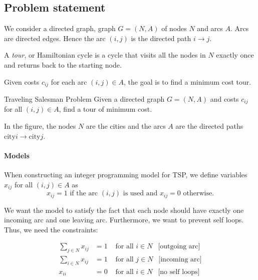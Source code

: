 \subsection*{Problem statement}
We consider a directed graph, graph $G = (N,A)$ of nodes $N$ and arcs $A$.   Arcs are directed edges.  Hence the arc $(i,j)$ is the directed path $i \to j$.

A \emph{tour}, or Hamiltonian cycle %
is a cycle that visits all the nodes in $N$ exactly once and returns back to the starting node. 


Given costs $c_{ij}$ for each arc $(i,j) \in A$, the goal is to find a minimum cost tour.


\begin{general}{Traveling Salesman Problem}{\nphard}
Given a directed graph $G = (N,A)$ and costs $c_{ij}$ for all $(i,j) \in A$, find a tour of minimum cost.
\end{general}
\begin{center}
\end{center}
In the figure, the nodes $N$ are the cities and the arcs $A$ are the directed paths $\text{city} i \to \text{city} j$.

\paragraph{Models}
When constructing an integer programming model for TSP, we define variables $x_{ij}$ for all $(i,j) \in A$ as 
$$
x_{ij } = 1 \text{ if the arc $(i,j)$ is used  and   }  x_{ij} = 0 \text{   otherwise.}
$$

We want the model to satisfy the fact that each node should have exactly one incoming arc and one leaving arc.  Furthermore, we want to prevent self loops.  Thus, we need the constraints:

\begin{align}
\label{eq:tsp-part-model}
\sum_{j\in N} x_{ij} &= 1 & \text{ for all } i \in N \ \ \text{ [outgoing arc]}\\
\sum_{i \in N} x_{ij} &= 1 & \text{ for all } j \in N \ \ \text{ [incoming arc]}\\
\label{eq:tsp-part-model3}
x_{ii} &= 0 & \text{ for all } i \in N \ \ \text{ [no self loops]} 
\end{align}


